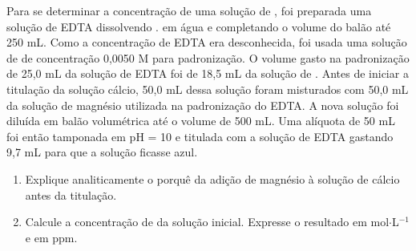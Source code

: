 Para se determinar a concentração de uma solução de , foi preparada uma solução de EDTA dissolvendo .
 em água e completando o volume do balão até 250 mL.
Como a concentração de EDTA era desconhecida, foi usada uma solução de  de concentração 0,0050 M para padronização.
O volume gasto na padronização de 25,0 mL da solução de EDTA foi de 18,5 mL da solução de .
Antes de iniciar a titulação da solução cálcio, 50,0 mL dessa solução foram misturados com 50,0 mL da solução de magnésio utilizada na padronização do EDTA.
A nova solução foi diluída em balão volumétrica até o volume de 500 mL.
Uma alíquota de 50 mL foi então tamponada em pH = 10 e titulada com a solução de EDTA gastando 9,7 mL para que a solução ficasse azul.

\begin{enumerate}[label = (\alph*)]
	\item Explique analiticamente o porquê da adição de magnésio à solução de cálcio antes da titulação.
	\item Calcule a concentração de  da solução inicial. Expresse o resultado em mol$\cdot$L$^{-1}$ e em ppm.
\end{enumerate}
